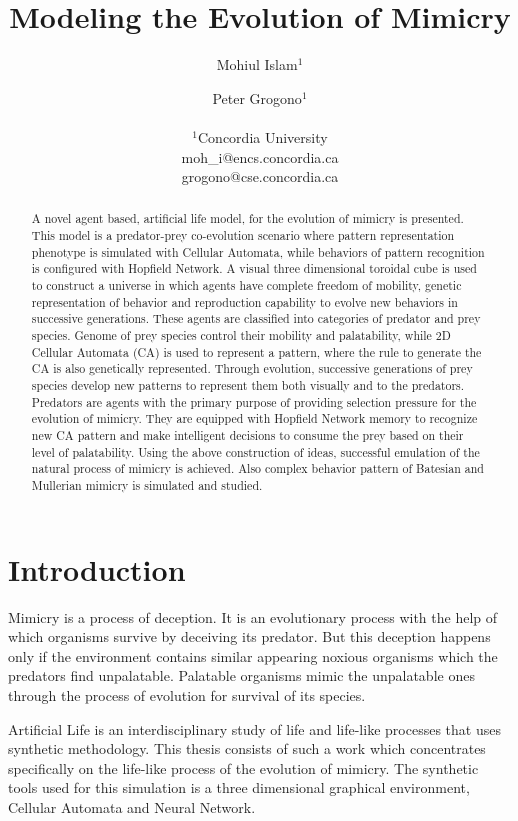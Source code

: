 \documentclass[letterpaper]{article}
\title{Modeling the Evolution of Mimicry}
\author{Mohiul Islam$^{1}$ \and Peter Grogono$^{1}$ \\
\mbox{}\\
$^1$Concordia University  \\
moh\_i@encs.concordia.ca \\
grogono@cse.concordia.ca}
\numberwithin{equation}{section}
\begin{document}
\maketitle

\begin{abstract}
A novel agent based, artificial life model, for the evolution of mimicry is presented. This model is a predator-prey co-evolution scenario where pattern representation phenotype is simulated with Cellular Automata, while behaviors of pattern recognition is configured with Hopfield Network. A visual three dimensional toroidal cube is used to construct a universe in which agents have complete freedom of mobility, genetic representation of behavior and reproduction capability to evolve new behaviors in successive generations. These agents are classified into categories of predator and prey species. Genome of prey species control their mobility and palatability, while 2D Cellular Automata (CA) is used to represent a pattern, where the rule to generate the CA is also genetically represented. Through evolution, successive generations of prey species develop new patterns to represent them both visually and to the predators. Predators are agents with the primary purpose of providing selection pressure for the evolution of mimicry. They are equipped with Hopfield Network memory to recognize new CA pattern and make intelligent decisions to consume the prey based on their level of palatability. Using the above construction of ideas, successful emulation of the natural process of mimicry is achieved. Also complex behavior pattern of Batesian and Mullerian mimicry is simulated and studied.
\end{abstract}

\section{Introduction}
\label{section:introduction}

Mimicry is a process of deception. It is an evolutionary process with the help of which organisms survive by deceiving its predator. But this deception happens only if the environment contains similar appearing noxious organisms which the predators find unpalatable. Palatable organisms mimic the unpalatable ones through the process of evolution for survival of its species.

Artificial Life is an interdisciplinary study of life and life-like processes that uses synthetic methodology. This thesis consists of such a work which concentrates specifically on the life-like process of the evolution of mimicry. The synthetic tools used for this simulation is a three dimensional graphical environment, Cellular Automata and Neural Network. 
\end{document}
